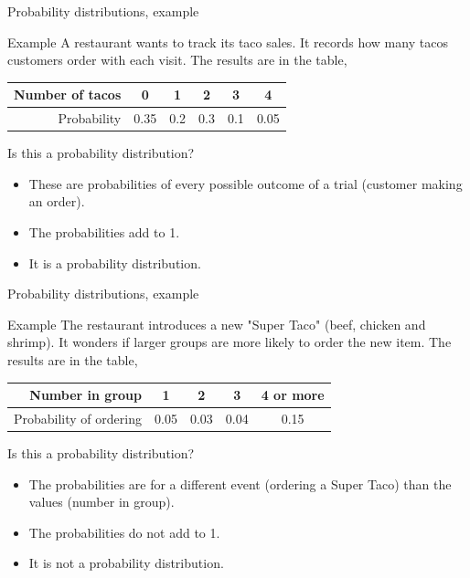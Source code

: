 \documentclass[xcolor=table, aspectratio=169, bigger]{beamer}
\begin{document}
\begin{frame}{Probability distributions, example}
\begin{exampleblock}{Example}
A restaurant wants to track its taco sales. It records how many tacos customers order with each visit. The results are in the table,\\
\medskip
{\centering \tabspacemed
\begin{tabular}{r | c cccc}
Number of tacos & 0 & 1 & 2 & 3 & 4\\
\hline
Probability &  0.35 & 0.2 & 0.3 & 0.1 & 0.05
\end{tabular}\par
}
\medskip
Is this a probability distribution?
\begin{itemize}
\pause\item These are probabilities of every possible outcome of a trial (customer making an order).
\pause\item The probabilities add to 1.
\pause\item It is a probability distribution.
\end{itemize}
\end{exampleblock}
\end{frame}

\begin{frame}{Probability distributions, example}
\begin{exampleblock}{Example}
The restaurant introduces a new "Super Taco" (beef, chicken and shrimp). It wonders if larger groups are more likely to order the new item. The results are in the table,\\
\medskip
{\centering \tabspacemed
\begin{tabular}{r | cccc}
Number in group & 1 & 2 & 3 & 4 or more \\
\hline
Probability of ordering & 0.05 & 0.03 & 0.04 & 0.15
\end{tabular}\par
}
\medskip
Is this a probability distribution?
\begin{itemize}
\pause\item The probabilities are for a different event (ordering a Super Taco) than the values (number in group). 
\pause\item The probabilities do not add to 1.
\pause\item It is not a probability distribution.
\end{itemize}
\end{exampleblock}
\end{frame}
\end{document}
